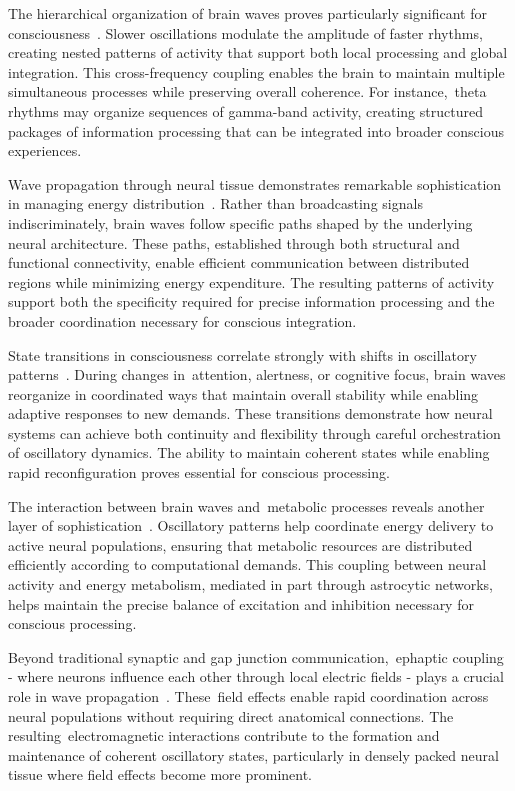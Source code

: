 The hierarchical organization of brain waves proves particularly significant for consciousness~\cite{Lisman2013, Canolty2010}. Slower oscillations modulate the amplitude of faster rhythms, creating nested patterns of activity that support both local processing and global integration. This cross-frequency coupling enables the brain to maintain multiple simultaneous processes while preserving overall coherence. For instance,~theta rhythms may organize sequences of gamma-band activity, creating structured packages of information processing that can be integrated into broader conscious experiences.

Wave propagation through neural tissue demonstrates remarkable sophistication in managing energy distribution~\cite{Palva2012, pinotsis2023cytoelectric}. Rather than broadcasting signals indiscriminately, brain waves follow specific paths shaped by the underlying neural architecture. These paths, established through both structural and functional connectivity, enable efficient communication between distributed regions while minimizing energy expenditure. The resulting patterns of activity support both the specificity required for precise information processing and the broader coordination necessary for conscious integration.

State transitions in consciousness correlate strongly with shifts in oscillatory patterns~\cite{Singer2018, Wang2020}. During changes in~attention, alertness, or cognitive focus, brain waves reorganize in coordinated ways that maintain overall stability while enabling adaptive responses to new demands. These transitions demonstrate how neural systems can achieve both continuity and flexibility through careful orchestration of oscillatory dynamics. The ability to maintain coherent states while enabling rapid reconfiguration proves essential for conscious processing.

The interaction between brain waves and~metabolic processes reveals another layer of sophistication~\cite{Nyhus2010, DiNuzzo2017}. Oscillatory patterns help coordinate energy delivery to active neural populations, ensuring that metabolic resources are distributed efficiently according to computational demands. This coupling between neural activity and energy metabolism, mediated in part through astrocytic networks, helps maintain the precise balance of excitation and inhibition necessary for conscious processing.

Beyond traditional synaptic and gap junction communication,~ephaptic coupling - where neurons influence each other through local electric fields - plays a crucial role in wave propagation~\cite{Buzsaki2006, anastassiou2015ephaptic}. These~field effects enable rapid coordination across neural populations without requiring direct anatomical connections. The resulting~electromagnetic interactions contribute to the formation and maintenance of coherent oscillatory states, particularly in densely packed neural tissue where field effects become more prominent.

